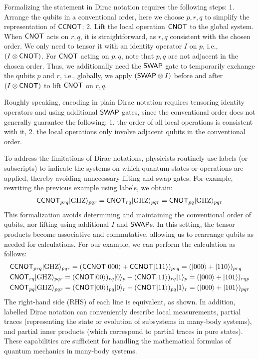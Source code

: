 Formalizing the statement in Dirac notation requires the following
steps: 1. Arrange the qubits in a conventional order, here we choose
$p,r,q$ to simplify the representation of ${\mathsf{CCNOT}}$; 2. Lift the local
operation ${\mathsf{CNOT}}$ to the global system. When ${\mathsf{CNOT}}$ acts on $r,q$, it is
straightforward, as $r,q$ consistent with the chosen order. We only need
to tensor it with an identity operator $I$ on $p$, i.e., $(I\otimes
{\mathsf{CNOT}})$.  For ${\mathsf{CNOT}}$ acting on $p,q$, note that $p,q$ are not
adjacent in the chosen order. Thus, we additionally need the ${\mathsf{SWAP}}$ gate to
temporarily exchange the qubits $p$ and $r$, i.e., globally, we apply
$({\mathsf{SWAP}}\otimes I)$ before and after $(I\otimes {\mathsf{CNOT}})$ to lift ${\mathsf{CNOT}}$ on $r,q$.



Roughly speaking, encoding in plain Dirac notation requires
tensoring identity operators and using additional ${\mathsf{SWAP}}$ gates,
since the conventional order does not generally guarantee the following: 1. the order
of all local operations is consistent with it, 2. the local operations
only involve adjacent qubits in the conventional order.

To address the limitations of Dirac notations, physicists routinely
use labels (or subscripts) to indicate the systems on which quantum
states or operations are applied, thereby avoiding unnecessary lifting
and swap gates. For example, rewriting the previous example using labels,
we obtain:
\begin{align*}
  {\mathsf{CCNOT}}_{prq}|{\mathrm{GHZ}}\rangle_{pqr} = 
  {\mathsf{CNOT}}_{rq}|{\mathrm{GHZ}}\rangle_{pqr}
  = {\mathsf{CNOT}}_{pq}|{\mathrm{GHZ}}\rangle_{pqr}
\end{align*}
This formalization avoids determining and maintaining the conventional
order of qubits, nor lifting using additional $I$ and ${\mathsf{SWAP}}$s. In
this setting, the tensor products become associative and
commutative, allowing us to rearrange qubits as needed for
calculations. For our example, we can perform the calculation as
follows:
\begin{align*}
  &{\mathsf{CCNOT}}_{prq}|{\mathrm{GHZ}}\rangle_{pqr}
  = ({\mathsf{CCNOT}}|000\rangle + {\mathsf{CCNOT}}|111\rangle)_{prq}
  = (|000\rangle + |110\rangle)_{prq}\\
  &{\mathsf{CNOT}}_{rq}|{\mathrm{GHZ}}\rangle_{pqr}
  = ({\mathsf{CNOT}}|00\rangle)_{rq}|0\rangle_p + ({\mathsf{CNOT}}|11\rangle)_{rq}|1\rangle_p
  =(|000\rangle + |101\rangle)_{rqp}\\
  &{\mathsf{CNOT}}_{pq}|{\mathrm{GHZ}}\rangle_{pqr}
  = ({\mathsf{CNOT}}|00\rangle)_{pq}|0\rangle_r + ({\mathsf{CNOT}}|11\rangle)_{pq}|1\rangle_r
  = (|000\rangle + |101\rangle)_{pqr}
\end{align*}
The right-hand side (RHS) of each line is equivalent, as shown.  
In addition, labelled
Dirac notation can conveniently describe local measurements, partial traces (representing the state or evolution of subsystems in many-body systems), and partial inner products (which correspond to partial traces in pure states). These capabilities are sufficient for handling the mathematical formulas of quantum mechanics in many-body systems.

